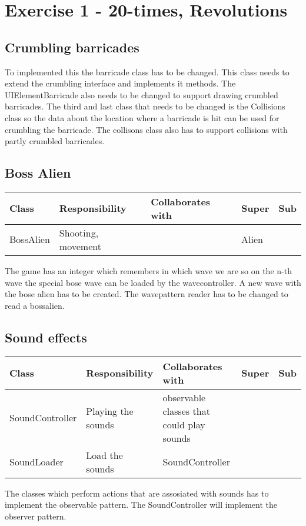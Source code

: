 \section{Exercise 1 - 20-times, Revolutions }
\subsection{Crumbling barricades }
To implemented this the barricade class has to be changed. This class needs to extend the crumbling interface and implements it methods. The UIElementBarricade also needs to be changed to support drawing crumbled barricades. The third and last class that needs to be changed is the Collisions class so the data about the location where a barricade is hit can be used for crumbling the barricade. The collisons class also has to support collisions with partly crumbled barricades.
\subsection{ Boss Alien}
\begin{center}
    \begin{tabular}{ | p{4.5cm} | p{3cm} | p{3cm} | p{3cm} | p{1cm} |}
  \hline
    Class & Responsibility & Collaborates with & Super & Sub \\ \hline
   BossAlien & Shooting, movement  &  & Alien & \\ \hline

    \end{tabular}
\end{center}
The game has an integer which remembers in which wave we are so on the n-th wave the special bose wave can be loaded by the wavecontroller. 
A new wave with the bose alien has to be created. The wavepattern reader has to be changed to read a bossalien.
\subsection{ Sound effects}
\begin{center}
    \begin{tabular}{ | p{4.5cm} | p{3cm} | p{3cm} | p{3cm} | p{1cm} |}
  \hline
    Class & Responsibility & Collaborates with & Super & Sub \\ \hline
   SoundController & Playing the sounds  & observable classes that could play sounds  &  & \\ \hline
   SoundLoader & Load the sounds  & SoundController  &  & \\ \hline

    \end{tabular}
\end{center}

The classes which perform actions that are assosiated with sounds has to implement the observable pattern.
The SoundController will implement the observer pattern.
